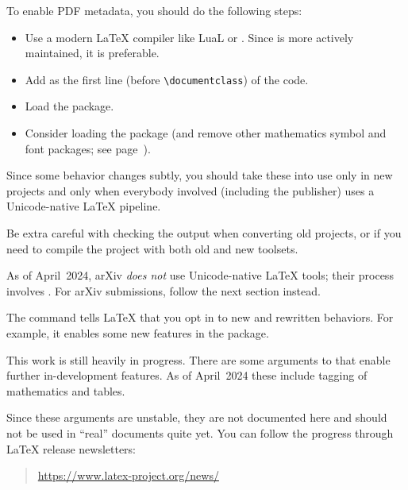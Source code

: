 To enable PDF metadata, you should do the following steps:
\begin{itemize}
\item Use a modern \LaTeX{} compiler like LuaL or .
    Since  is more actively maintained, it is preferable.
\item Add  as the first line (before \verb|\documentclass|) of the code.
\item Load the  package.
\item Consider loading the  package
    (and remove other mathematics symbol and font packages;
    see page~\pageref{rem:math unicode}).
\end{itemize}

\begin{warning}
Since some behavior changes subtly,
you should take these into use only in new projects
and only when everybody involved (including the publisher) uses a Unicode-native \LaTeX{} pipeline.

Be extra careful with checking the output when converting old projects,
or if you need to compile the project with both old and new toolsets.
\end{warning}

\begin{warning}
As of April~2024, arXiv \emph{does not} use Unicode-native \LaTeX{} tools;
their process involves .
For arXiv submissions, follow the next section instead.
\end{warning}

The  command tells \LaTeX{} that you opt in
to new and rewritten behaviors.
For example, it enables some new features in the  package.

\begin{latexthree}
This work is still heavily in progress.
There are some arguments to  that enable further in-development features.
As of April~2024 these include tagging of mathematics and tables.

Since these arguments are unstable, they are not documented here
and should not be used in ``real'' documents quite yet.
You can follow the progress through \LaTeX{} release newsletters:
\begin{quote}
\url{https://www.latex-project.org/news/}
\end{quote}
\end{latexthree}

